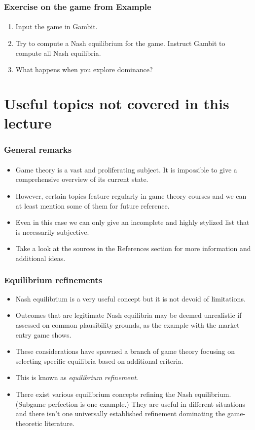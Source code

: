 \documentclass[10pt]{beamer}
\theoremstyle{definition}
\begin{document}
\begin{frame}[fragile]
\frametitle{Exercise on the game from Example }
\framesubtitle{}
\begin{enumerate}\itemsep1em
\item Input the game in Gambit.
\item Try to compute a Nash equilibrium for the game. Instruct Gambit to compute all Nash equilibria. 
\item What happens when you explore dominance?
\end{enumerate}
\end{frame}



\section{Useful topics not covered in this lecture}

\begin{frame}[fragile]
\frametitle{General remarks}
\framesubtitle{}
\begin{itemize}\itemsep1em
\item Game theory is a vast and proliferating subject. It is impossible to give a comprehensive overview of its current state.
\item However, certain topics feature regularly in game theory courses and we can at least mention some of them for future reference.
\item Even in this case we can only give an incomplete and highly stylized list that is necessarily subjective.
\item Take a look at the sources in the References section for more information and additional ideas.
\end{itemize}
\end{frame}

\begin{frame}[fragile]
\frametitle{Equilibrium refinements}
\begin{itemize}\itemsep1em
\item Nash equilibrium is a very useful concept but it is not devoid of limitations.
\item Outcomes that are legitimate Nash equilibria may be deemed unrealistic if assessed on common plausibility grounds, as the example with the market entry game shows.
\item These considerations have spawned a branch of game theory focusing on selecting specific equilibria based on additional criteria.
\item This is known as \emph{equilibrium refinement}.
\item There exist various equilibrium concepts refining the Nash equilibrium. (Subgame perfection is one example.) They are useful in different situations and there isn't one universally established refinement dominating the game-theoretic literature.
\end{itemize}
\end{frame}
\end{document}
